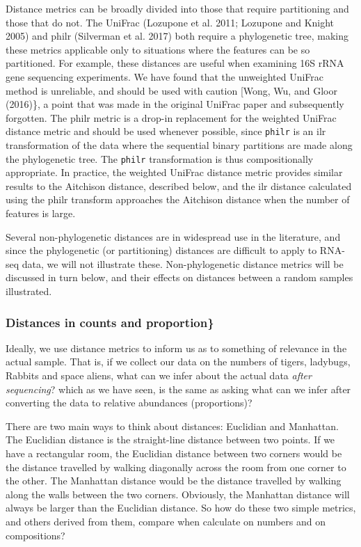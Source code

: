 \documentclass[onecolumn]{article}
\begin{document}
Distance metrics can be broadly divided into those that require partitioning and those that do not. The UniFrac (Lozupone et al. 2011; Lozupone and Knight 2005) and philr (Silverman et al. 2017) both require a phylogenetic tree, making these metrics applicable only to situations where the features can be so partitioned. For example, these distances are useful when examining 16S rRNA gene sequencing experiments. We have found that the unweighted UniFrac method is unreliable, and should be used with caution {[}Wong, Wu, and Gloor (2016)\}, a point that was made in the original UniFrac paper and subsequently forgotten. The philr metric is a drop-in replacement for the weighted UniFrac distance metric and should be used whenever possible, since \texttt{philr} is an ilr transformation of the data where the sequential binary partitions are made along the phylogenetic tree. The \texttt{philr} transformation is thus compositionally appropriate. In practice, the weighted UniFrac distance metric provides similar results to the Aitchison distance, described below, and the ilr distance calculated using the philr transform approaches the Aitchison distance when the number of features is large.

Several non-phylogenetic distances are in widespread use in the literature, and since the phylogenetic (or partitioning) distances are difficult to apply to RNA-seq data, we will not illustrate these. Non-phylogenetic distance metrics will be discussed in turn below, and their effects on distances between a random samples illustrated.

\hypertarget{distances-in-counts-and-proportion}{%
\subsubsection{Distances in counts and proportion\}}\label{distances-in-counts-and-proportion}}

Ideally, we use distance metrics to inform us as to something of relevance in the actual sample. That is, if we collect our data on the numbers of tigers, ladybugs, Rabbits and space aliens, what can we infer about the actual data \emph{after  sequencing}? which as we have seen, is the same as asking what can we infer after converting the data to relative abundances (proportions)?

There are two main ways to think about distances: Euclidian and Manhattan. The Euclidian distance is the straight-line distance between two points. If we have a rectangular room, the Euclidian distance between two corners would be the distance travelled by walking diagonally across the room from one corner to the other. The Manhattan distance would be the distance travelled by walking along the walls between the two corners. Obviously, the Manhattan distance will always be larger than the Euclidian distance. So how do these two simple metrics, and others derived from them, compare when calculate on numbers and on compositions?
\end{document}
